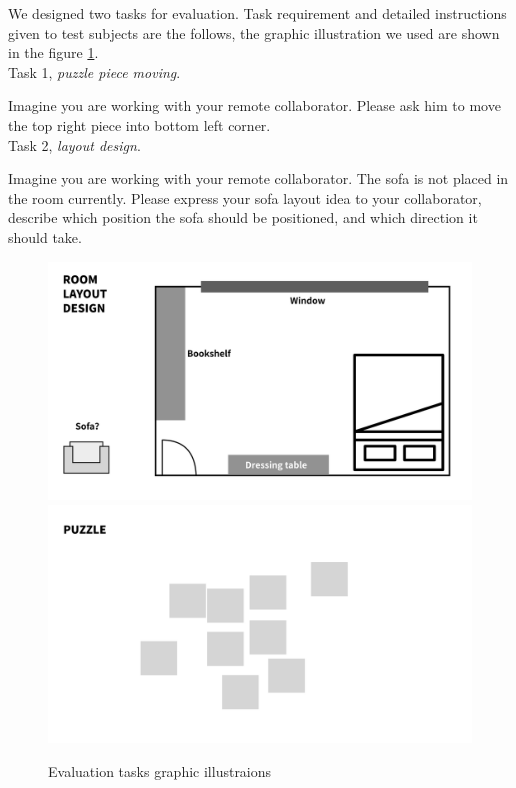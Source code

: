 \documentclass[12pt,twoside]{article}
\begin{document}
We designed two tasks for evaluation. Task requirement and detailed instructions given to test subjects are the follows, the graphic illustration we used are shown in the figure \ref{fig:eva_task}.\\

Task 1, \textit{puzzle piece moving}.

Imagine you are working with your remote collaborator. Please ask him to move the top right piece into bottom left corner.\\

Task 2, \textit{layout design}.

Imagine you are working with your remote collaborator. The sofa is not placed in the room currently. Please express your sofa layout idea to your collaborator, describe which position the sofa should be positioned, and which direction it should take.

\begin{figure}[h!]
\centering
\includegraphics[scale=0.12]{img/eva_task1.jpg}
\includegraphics[scale=0.12]{img/eva_task2.jpg}
\caption{Evaluation tasks graphic illustraions}\label{fig:eva_task}
\end{figure}
\end{document}
